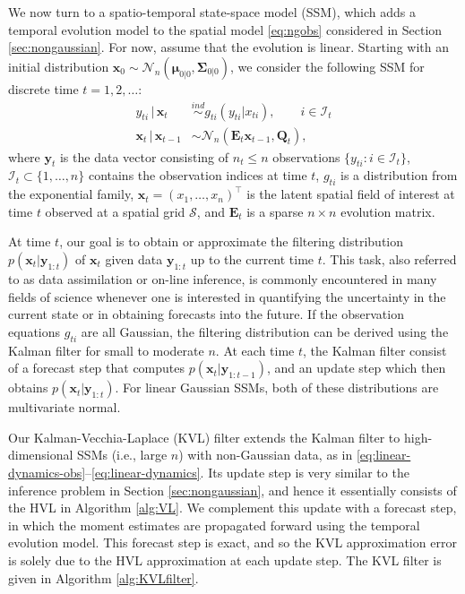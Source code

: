 \documentclass[12pt,letterpaper]{article}
\theoremstyle{propstyle}
\theoremstyle{propstyle}
\theoremstyle{propstyle}
\theoremstyle{propstyle}
\theoremstyle{propstyle}
\newcommand{\bx}{\mathbf{x}}
\newcommand{\by}{\mathbf{y}}
\newcommand{\bQ}{\mathbf{Q}}
\newcommand{\bfmu}{\bm{\mu}}
\newcommand{\bfSigma}{\bm{\Sigma}}
\newcommand{\normal}{\mathcal{N}}
\newcommand{\levol}{\mathbf{E}}
\newcommand{\grid}{\mathcal{S}}
\newcommand{\obs}{\mathcal{I}}
\begin{document}
We now turn to a spatio-temporal state-space model (SSM), which adds a temporal evolution model to the spatial model \eqref{eq:ngobs} considered in Section \ref{sec:nongaussian}. For now, assume that the evolution is linear.
Starting with an initial distribution $\bx_0 \sim \normal_{n}(\bfmu_{0|0},\bfSigma_{0|0})$, we consider the following SSM for discrete time $t=1,2,\ldots$:
\begin{align}
y_{ti} \,|\, \bx_t & \stackrel{ind}{\sim} g_{ti}(y_{ti} | x_{ti}), \qquad i \in \obs_t \label{eq:linear-dynamics-obs}\\
\bx_t \,|\, \bx_{t-1} & \sim \normal_n(\levol_t\bx_{t-1},\bQ_t),
\label{eq:linear-dynamics}
\end{align}
where $\by_{t}$ is the data vector consisting of $n_t \leq n$ observations $\{y_{ti}: i \in \obs_t\}$, $\obs_t \subset \{1,\ldots,n\}$ contains the observation indices at time $t$, $g_{ti}$ is a distribution from the exponential family, $\bx_t = (x_1,\ldots,x_n)^\top$ is the latent spatial field of interest at time $t$ observed at a spatial grid $\grid$, and $\levol_t$ is a sparse $n \times n$ evolution matrix.

At time $t$, our goal is to obtain or approximate the filtering distribution $p(\bx_t|\by_{1:t})$ of $\bx_t$ given data $\by_{1:t}$ up to the current time $t$. This task, also referred to as data assimilation or on-line inference, is commonly encountered in many fields of science whenever one is interested in quantifying the uncertainty in the current state or in obtaining forecasts into the future.
If the observation equations $g_{ti}$ are all Gaussian, the filtering distribution can be derived using the Kalman filter \citep{Kalman1960} for small to moderate $n$. At each time $t$, the Kalman filter consist of a forecast step that computes $p(\bx_t|\by_{1:t-1})$, and an update step which then obtains $p(\bx_t|\by_{1:t})$. For linear Gaussian SSMs, both of these distributions are multivariate normal.

Our Kalman-Vecchia-Laplace (KVL) filter extends the Kalman filter to high-dimensional SSMs (i.e., large $n$) with non-Gaussian data, as in \eqref{eq:linear-dynamics-obs}--\eqref{eq:linear-dynamics}. %
Its update step is very similar to the inference problem in Section \ref{sec:nongaussian}, and hence it essentially consists of the HVL in Algorithm \ref{alg:VL}. 
We complement this update with a forecast step, in which the moment estimates are propagated forward using the temporal evolution model. This forecast step is exact, and so the KVL approximation error is solely due to the HVL approximation at each update step. The KVL filter is given in Algorithm \ref{alg:KVLfilter}.
\end{document}
